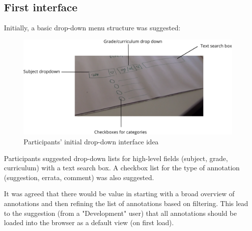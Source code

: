 \subsection{First interface}
Initially, a basic drop-down menu structure was suggested:
\begin{figure}[h!]
    \centering
    \includegraphics[width=\textwidth]{Figures/PD1shot2labels.png}
 \caption{Participants' initial drop-down interface idea}
\end{figure}

Participants suggested drop-down lists for high-level fields (subject, grade, curriculum) with a text search box. A checkbox list for the type of annotation (suggestion, errata, comment) was also suggested.

It was agreed that there would be value in starting with a broad overview of annotations and then refining the list of annotations based on filtering. This lead to the suggestion (from a "Development" user) that all annotations should be loaded into the browser as a default view (on first load).

